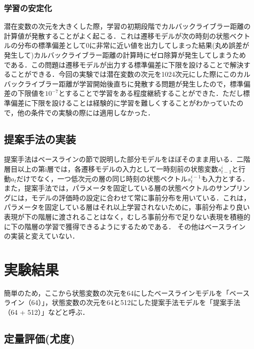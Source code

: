 \subsubsection{学習の安定化}
潜在変数の次元を大きくした際，学習の初期段階でカルバックライブラー距離の計算値が発散することがよく起こる．これは遷移モデルが次の時刻の状態ベクトルの分布の標準偏差として0に非常に近い値を出力してしまった結果(丸め誤差が発生して)カルバックライブラー距離の計算時にゼロ除算が発生してしまうためである．この問題は遷移モデルが出力する標準偏差に下限を設けることで解決することができる．今回の実験では潜在変数の次元を1024次元にした際にこのカルバックライブラー距離が学習開始後直ちに発散する問題が発生したので，標準偏差の下限値を$10^{-7}$とすることで学習をある程度継続することができた．ただし標準偏差に下限を設けることは経験的に学習を難しくすることがわかっていたので，他の条件での実験の際には適用しなかった．

\subsection{提案手法の実装}
提案手法はベースラインの節で説明した部分モデルをほぼそのまま用いる．二階層目以上の第i層では，各遷移モデルの入力として一時刻前の状態変数$s^i_{t-1}$と行動$a_t$だけでなく，一つ低次元の層の同じ時刻の状態ベクトル$s^{i-1}_t$も入力とする．また，提案手法では，パラメータを固定している層の状態ベクトルのサンプリングには，モデルの評価時の設定に合わせて常に事前分布を用いている．これは，パラメータを固定している層はそれ以上学習されないために，事前分布より良い表現が下の階層に渡されることはなく，むしろ事前分布で足りない表現を積極的に下の階層の学習で獲得できるようにするためである．
その他はベースラインの実装と変えていない．


\section{実験結果}

簡単のため，ここから状態変数の次元を64にしたベースラインモデルを「ベースライン（64）」，状態変数の次元を64と512にした提案手法モデルを「提案手法（64 + 512）」などと呼ぶ．

\subsection{定量評価(尤度)}

